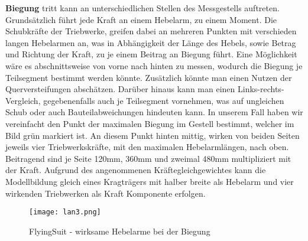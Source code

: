 \textbf{Biegung} tritt kann an unterschiedlichen Stellen des Messgestells auftreten. Grundsätzlich führt jede Kraft an einem Hebelarm, zu einem Moment.
Die Schubkräfte der Triebwerke, greifen dabei an mehreren Punkten mit verschieden langen Hebelarmen an, was in Abhängigkeit der Länge des Hebels,
sowie Betrag und Richtung der Kraft, zu je einem Beitrag an Biegung führt. Eine Möglichkeit wäre es abschnittsweise von vorne nach hinten zu messen,
wodurch die Biegung je Teilsegment bestimmt werden könnte. Zusätzlich könnte man einen Nutzen der Querversteifungen abschätzen. Darüber hinaus kann man einen Links-rechts-Vergleich, gegebenenfalls auch je Teilsegment vornehmen, was auf ungleichen Schub oder auch Bauteilabweichungen hindeuten kann. In unserem Fall haben wir vereinfacht den Punkt der maximalen Biegung im Gestell bestimmt, welcher im Bild grün markiert ist. An diesem Punkt hinten mittig, wirken von beiden Seiten jeweils vier Triebwerkskräfte, mit den maximalen Hebelarmlängen, nach oben. Beitragend sind je Seite 120mm, 360mm und zweimal 480mm multipliziert mit der Kraft. Aufgrund des angenommenen Kräftegleichgewichtes kann die Modellbildung gleich eines Kragträgers mit halber breite als Hebelarm und vier wirkenden Triebwerken als Kraft Komponente erfolgen. 

\begin{figure}[htbp]
    \begin{center}
        \texttt{[image: lan3.png]}
        \caption[FlyingSuit - wirksame Hebelarme bei der Biegung (Abbildungsverzeichnis)]{FlyingSuit - wirksame Hebelarme bei der Biegung}
        
        \label{fig:lan3}
    \end{center}
\end{figure}


